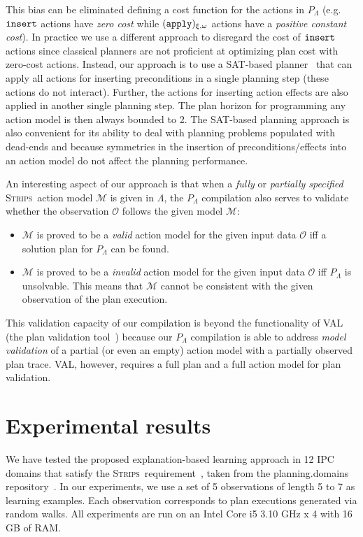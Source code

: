 \documentclass[runningheads]{llncs}
\newcommand{\strips}{\textsc{Strips}}     %
\begin{document}
This bias can be eliminated defining a cost function for the actions in $P_{\Lambda}$ (e.g. ${\tt \small insert}$ actions have {\em zero cost} while ${\tt \small (apply)_{\xi,\omega}}$ actions have a {\em positive constant cost}). In practice we use a different approach to disregard the cost of ${\tt \small insert}$ actions since classical planners are not proficient at optimizing plan cost with zero-cost actions. Instead, our approach is to use a SAT-based planner~\cite{rintanen2014madagascar} that can apply all actions for inserting preconditions in a single planning step (these actions do not interact). Further, the actions for inserting action effects are also applied in another single planning step. The plan horizon for programming any action model is then always bounded to 2. The SAT-based planning approach is also convenient for its ability to deal with planning problems populated with dead-ends and because symmetries in the insertion of preconditions/effects into an action model do not affect the planning performance.

An interesting aspect of our approach is that when a {\em fully} or {\em partially specified} \strips\ action model $\mathcal{M}$ is given in $\Lambda$, the $P_{\Lambda}$ compilation also serves to validate whether the observation $\mathcal{O}$ follows the given model $\mathcal{M}$:
\begin{itemize}
	\item $\mathcal{M}$ is proved to be a {\em valid} action model for the given input data $\mathcal{O}$ iff a solution plan for $P_{\Lambda}$ can be found.
	\item $\mathcal{M}$ is proved to be a {\em invalid} action model for the given input data $\mathcal{O}$ iff $P_{\Lambda}$ is unsolvable. This means that $\mathcal{M}$ cannot be consistent with the given observation of the plan execution.
\end{itemize}
This validation capacity of our compilation is beyond the functionality of VAL (the plan validation tool~\cite{howey2004val}) because our $P_{\Lambda}$ compilation is able to address {\em model validation} of a partial (or even an empty) action model with a partially observed plan trace. VAL, however, requires a full plan and a full action model for plan validation.


\section{Experimental results}

We have tested the proposed explanation-based learning approach in 12 IPC domains that satisfy the \strips\ requirement~\cite{fox2003pddl2}, taken from the {\sc planning.domains} repository~\cite{muise2016planning}. In our experiments, we use a set of 5 observations of length 5 to 7 as learning examples. Each observation corresponds to plan executions generated via random walks. All experiments are run on an Intel Core i5 3.10 GHz x 4 with 16 GB of RAM.
\end{document}
